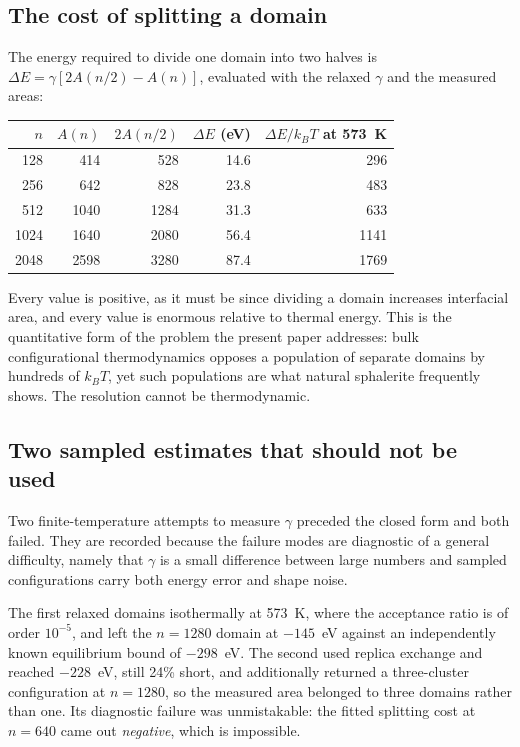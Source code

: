 \documentclass[11pt,a4paper]{article}
\begin{document}
\subsection{The cost of splitting a domain}
\label{sec:splitting}

The energy required to divide one domain into two halves is
$\Delta E = \gamma\left[2A(n/2) - A(n)\right]$, evaluated with the relaxed
$\gamma$ and the measured areas:

\begin{center}
\small
\begin{tabular}{rrrrr}
\toprule
$n$ & $A(n)$ & $2A(n/2)$ & $\Delta E$ (eV) & $\Delta E / k_BT$ at 573~K \\
\midrule
128  & 414  & 528  & 14.6 & 296 \\
256  & 642  & 828  & 23.8 & 483 \\
512  & 1040 & 1284 & 31.3 & 633 \\
1024 & 1640 & 2080 & 56.4 & 1141 \\
2048 & 2598 & 3280 & 87.4 & 1769 \\
\bottomrule
\end{tabular}
\end{center}

Every value is positive, as it must be since dividing a domain increases
interfacial area, and every value is enormous relative to thermal energy. This
is the quantitative form of the problem the present paper addresses: bulk
configurational thermodynamics opposes a population of separate domains by
hundreds of $k_BT$, yet such populations are what natural sphalerite frequently
shows. The resolution cannot be thermodynamic.

\subsection{Two sampled estimates that should not be used}
\label{sec:gammafailed}

Two finite-temperature attempts to measure $\gamma$ preceded the closed form and
both failed. They are recorded because the failure modes are diagnostic of a
general difficulty, namely that $\gamma$ is a small difference between large
numbers and sampled configurations carry both energy error and shape noise.

The first relaxed domains isothermally at 573~K, where the acceptance ratio is
of order $10^{-5}$, and left the $n = 1280$ domain at $-145$~eV against an
independently known equilibrium bound of $-298$~eV. The second used replica
exchange and reached $-228$~eV, still 24\% short, and additionally returned a
three-cluster configuration at $n = 1280$, so the measured area belonged to
three domains rather than one. Its diagnostic failure was unmistakable: the
fitted splitting cost at $n = 640$ came out \emph{negative}, which is
impossible.
\end{document}
